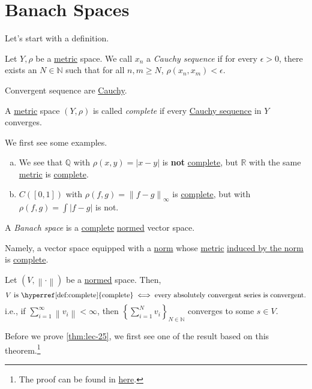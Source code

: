 \section{Banach Spaces}
Let's start with a definition.
\begin{definition}\label{def:Cauchy-sequence}
	Let \(Y, \rho \) be a \hyperref[def:metric]{metric} space. We call \(x_{n} \) a \emph{Cauchy sequence} if for every \(\epsilon >0\), there exists an
	\(N\in \mathbb{N} \) such that for all \(n, m\geq N\), \(\rho (x_{n} , x_{m} )< \epsilon \).
\end{definition}
\begin{note}
	Convergent sequence are \hyperref[def:Cauchy-sequence]{Cauchy}.
\end{note}

\begin{definition}[Complete]\label{def:complete}
	A \hyperref[def:metric]{metric} space \((Y, \rho )\) is called \emph{complete} if every \hyperref[def:Cauchy-sequence]{Cauchy sequence} in \(Y\) converges.
\end{definition}

\begin{eg}
	We first see some examples.
	\begin{enumerate}[(a)]
		\item We see that \(\mathbb{Q} \) with \(\rho (x, y) = \left\vert x - y \right\vert \) is \textbf{not} \hyperref[def:complete]{complete}, but \(\mathbb{R} \) with
		      the same \hyperref[def:metric]{metric} is \hyperref[def:complete]{complete}.
		\item \(C([0, 1])\) with \(\rho (f, g) = \left\lVert f-g\right\rVert _\infty \) is \hyperref[def:complete]{complete}, but with \(\rho (f, g) = \int \left\vert f-g \right\vert \) is not.
	\end{enumerate}
\end{eg}

\begin{definition}\label{def:Banach-space}
	A \emph{Banach space} is a \hyperref[def:complete]{complete} \hyperref[def:norm]{normed} vector space.
\end{definition}
\begin{remark}
	Namely, a vector space equipped with a \hyperref[def:norm]{norm} whose \hyperref[def:metric]{metric} \hyperref[induced-metric]{induced by the norm} is
	\hyperref[def:complete]{complete}.
\end{remark}

\begin{theorem}\label{thm:lec-25}
	Let \((V, \left\lVert \cdot\right\rVert )\) be a \hyperref[def:norm]{normed} space. Then,
	\[
		\text{\(V\) is \hyperref[def:complete]{complete}} \iff \text{every absolutely convergent series is convergent}.
	\]
	i.e., if \(\sum_{i=1}^{\infty} \left\lVert v_{i} \right\rVert<\infty\), then \(\left\{\sum_{i=1}^{N} v_{i} \right\}_{N\in \mathbb{N} }\)
	converges to some \(s\in V\).
\end{theorem}
Before we prove \autoref{thm:lec-25}, we first see one of the result based on this theorem.\footnote{The proof can be found in \hyperref[pf:thm:lec25]{here}.}

